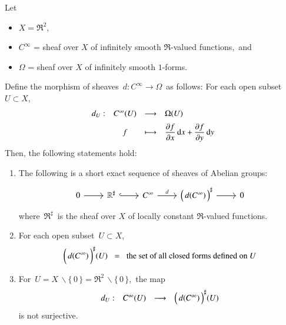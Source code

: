 \vskip 1.0cm
\begin{example}
\mbox{}\vskip 0.2cm
\noindent
Let
\begin{itemize}
\item
	$X = \Re^{2}$,\,
\item
	$C^{\infty}$ = sheaf over $X$ of infinitely smooth $\Re$-valued functions,\, and
\item
	$\Omega$ = sheaf over $X$ of infinitely smooth $1$-forms.
\end{itemize}
Define the morphism of sheaves
\,$d : C^{\infty} \longrightarrow \Omega$\,
as follows:
For each open subset $U \subset X$,
\begin{equation*}
\begin{array}{cccl}
d_{U} : & C^{\infty}(U) & \longrightarrow & \Omega(U)
\\
& \overset{{\color{white}\textnormal{\Large$1$}}}{f} & \longmapsto & \dfrac{\partial f}{\partial x}\,\d x +  \dfrac{\partial f}{\partial y}\,\d y
\end{array}
\end{equation*}
Then, the following statements hold:
\begin{enumerate}
\item
	The following is a short exact sequence of sheaves of Abelian groups:
	\begin{equation*}
	\begin{tikzcd}
	0                 \arrow[r] &
	\Re^{\sharp} \arrow[r, hook] &
	C^{\infty} \arrow[r, "d"] &
	\left(\,\overset{{\color{white}.}}{d(C^{\infty})}\,\right)^{\sharp} \arrow[r] &
	0
	\end{tikzcd}
	\end{equation*}
	where \,$\Re^{\sharp}$\, is the sheaf over $X$ of locally constant $\Re$-valued functions.
\item
	For each open subset \,$U \subset X$,\,
	\begin{equation*}
	\left(\,\overset{{\color{white}.}}{d(C^{\infty})}\,\right)^{\sharp}\!(U)
	\;\; = \;\;
		\textnormal{the set of all closed forms defined on $U$}
	\end{equation*}
\item
	For \,$U = X \,\backslash \{\,0\,\} = \Re^{2} \,\backslash \{\,0\,\}$,\,
	the map
	\begin{equation*}
	\begin{array}{cccl}
	d_{U} : & C^{\infty}(U) & \longrightarrow & \left(\,\overset{{\color{white}.}}{d(C^{\infty})}\,\right)^{\sharp}\!(U)
	\end{array}
	\end{equation*}
	is not surjective.
\end{enumerate}
\end{example}
